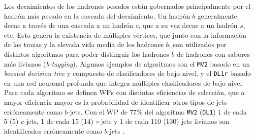 Los decaimientos de los hadrones pesados están gobernados principalmente por el hadrón más pesado en la cascada del decaimiento. Un hadrón $b$ generalmente decae a través de una cascada a un hadrón $c$, que a su vez decae a un hadrón $s$, etc. Esto genera la existencia de múltiples 
vértices, que junto con la información de las trazas y la elevada vida media de los hadrones $b$, son utilizados por distintos algoritmos para poder distinguir los hadrones $b$ de hadrones con sabores más livianos (\textit{b-tagging}). Algunos ejemplos de algoritmos \cite{btag} son el \texttt{MV2} basado en un \textit{boosted decision tree} y compuesto de clasificadores de bajo nivel, y el \texttt{DL1r} \cite{FTAG-2018-01, ATL-PHYS-PUB-2020-009} basado en una red neuronal profunda que integra múltiples clasificadores de bajo nivel. Para cada algoritmo se definen WPs con distintas eficiencias de selección, que a mayor eficiencia mayor es la probabilidad de identificar otros tipos de jets erróneamente como $b$-jets. Con el WP de 77\% del algoritmo \texttt{MV2} (\texttt{DL1}) 1 de cada 5 (5) $c$-jets, 1 de cada 15 (14) $\tau$-jets y 1 de cada 110 (130) jets livianos son identificados erróneamente como $b$-jets \cite{btag}.




